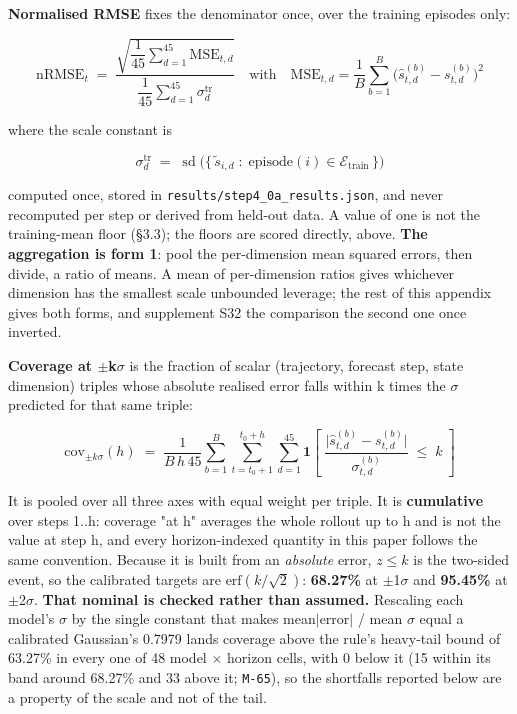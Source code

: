 \documentclass[10pt]{article}
\begin{document}
\textbf{Normalised RMSE} fixes the denominator once, over the training episodes only:

\[\mathrm{nRMSE}_t \;=\; \frac{\sqrt{\dfrac{1}{45}\sum_{d=1}^{45}\mathrm{MSE}_{t,d}}}{\dfrac{1}{45}\sum_{d=1}^{45}\sigma^{\mathrm{tr}}_{d}}\quad\text{with}\quad \mathrm{MSE}_{t,d}=\frac{1}{B}\sum_{b=1}^{B}\bigl(\hat{s}^{(b)}_{t,d}-s^{(b)}_{t,d}\bigr)^{2}\]

where the scale constant is

\[\sigma^{\mathrm{tr}}_{d} \;=\; \operatorname{sd}\bigl(\{\,\tilde{s}_{i,d}\;:\; \mathrm{episode}(i)\in\mathcal{E}_{\mathrm{train}}\,\}\bigr)\]

computed once, stored in \texttt{results/\allowbreak{}step4\_\allowbreak{}0a\_\allowbreak{}results\allowbreak{}.json}, and never recomputed per step or derived from held-out data. A value of one is not the training-mean floor (\S{}3.3); the floors are scored directly, above. \textbf{The aggregation is form 1}: pool the per-dimension mean squared errors, then divide, a ratio of means. A mean of per-dimension ratios gives whichever dimension has the smallest scale unbounded leverage; the rest of this appendix gives both forms, and supplement S32 the comparison the second one once inverted.

\textbf{Coverage at $\pm$k$\sigma$} is the fraction of scalar (trajectory, forecast step, state dimension) triples whose absolute realised error falls within k times the $\sigma$ predicted for that same triple:

\[\mathrm{cov}_{\pm k\sigma}(h) \;=\; \frac{1}{B\,h\,45}\sum_{b=1}^{B}\sum_{t=t_0+1}^{t_0+h}\sum_{d=1}^{45}\mathbf{1}\!\left[\;\frac{\bigl|\hat{s}^{(b)}_{t,d}-s^{(b)}_{t,d}\bigr|}{\sigma^{(b)}_{t,d}} \;\le\; k \;\right]\]

It is pooled over all three axes with equal weight per triple. It is \textbf{cumulative} over steps 1..h: coverage "at h" averages the whole rollout up to h and is not the value at step h, and every horizon-indexed quantity in this paper follows the same convention. Because it is built from an \emph{absolute} error, $z \le k$ is the two-sided event, so the calibrated targets are $\mathrm{erf}(k/\sqrt{2})$: \textbf{68.27\%} at $\pm$1$\sigma$ and \textbf{95.45\%} at $\pm$2$\sigma$. \textbf{That nominal is checked rather than assumed.} Rescaling each model's $\sigma$ by the single constant that makes mean$|$error$|$ / mean $\sigma$ equal a calibrated Gaussian's 0.7979 lands coverage above the rule's heavy-tail bound of 63.27\% in every one of 48 model $\times$ horizon cells, with 0 below it (15 within its band around 68.27\% and 33 above it; \texttt{M-65}), so the shortfalls reported below are a property of the scale and not of the tail.
\end{document}
